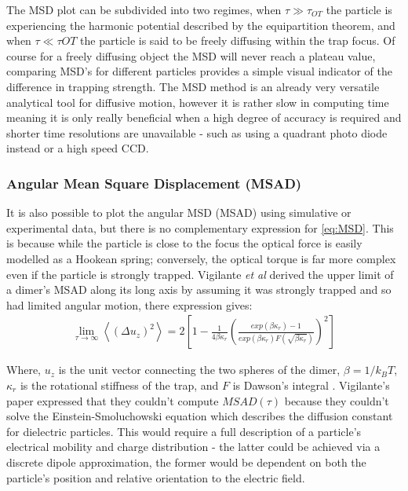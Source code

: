 The MSD plot can be subdivided into two regimes, when $\tau \gg \tau_{OT}$ 
the particle is experiencing the harmonic potential described by 
the equipartition theorem, and when $\tau \ll \tau{OT}$ the particle 
is said to be freely diffusing within the trap focus. Of course for 
a freely diffusing object the MSD will never reach a plateau value, 
comparing MSD's for different particles provides a simple visual 
indicator of the difference in trapping strength. The MSD method is 
an already very versatile analytical tool for diffusive motion, however 
it is rather slow in computing time meaning it is only really beneficial 
when a high degree of accuracy is required and shorter time resolutions 
are unavailable - such as using a quadrant photo diode instead or a high 
speed CCD.

\subsubsection{Angular Mean Square Displacement (MSAD)}
It is also possible to plot the angular MSD (MSAD) using 
simulative or experimental data, but there is no complementary 
expression for \eqref{eq:MSD}. This is because while the 
particle is close to the focus the optical force is easily 
modelled as a Hookean spring; conversely, the optical torque
is far more complex even if the particle is strongly trapped. 
Vigilante \textit{et al} \cite{Vigilante2020} derived the 
upper limit of a dimer's MSAD along its long axis by assuming 
it was strongly trapped and so had limited angular motion, 
there expression gives:
\begin{align}
	\lim_{\tau\to\infty}\left<(\Delta u_z)^2\right> = 
	2\left[1-\frac{1}{4\beta\kappa_r} 
	\left(\frac{exp(\beta\kappa_r)-1}
	{exp(\beta\kappa_r)F(\sqrt{\beta\kappa_r})
	}\right)^2\right]
\end{align}  

Where, $u_z$ is the unit vector connecting the two spheres of 
the dimer, $\beta=1/k_BT$, $\kappa_r$ is the rotational stiffness 
of the trap, and $F$ is Dawson's integral \cite{Oldham2008}. 
Vigilante's paper expressed that they couldn't compute 
$MSAD(\tau)$ because they couldn't solve the Einstein-Smoluchowski 
equation which describes the diffusion constant for dielectric 
particles. This would require a full description of a particle's 
electrical mobility and charge distribution - the latter could be 
achieved via a discrete dipole approximation, the former would be 
dependent on both the particle's position and relative orientation 
to the electric field.

